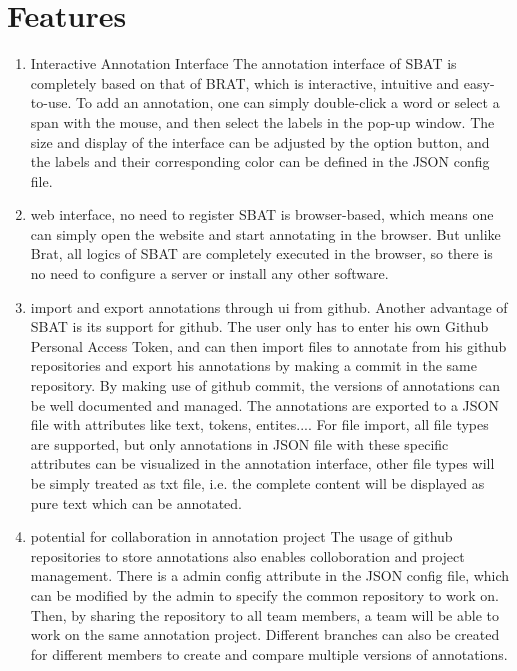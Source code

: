 \documentclass[a4paper]{article}
\begin{document}
\section{Features}
\begin{enumerate}
\item Interactive Annotation Interface
The annotation interface of SBAT is completely based on that of BRAT, which is interactive, intuitive and easy-to-use. To add an annotation, one can simply double-click a word or select a span with the mouse, and then select the labels in the pop-up window. The size and display of the interface can be adjusted by the option button, and the labels and their corresponding color can be defined in the JSON config file.
\item web interface, no need to register
SBAT is browser-based, which means one can simply open the website and start annotating in the browser. But unlike Brat, all logics of SBAT are completely executed in the browser, so there is no need to configure a server or install any other software.
\item import and export annotations through ui from github.
Another advantage of SBAT is its support for github. The user only has to enter his own Github Personal Access Token, and can then import files to annotate from his github repositories and export his annotations by making a commit in the same repository. By making use of github commit, the versions of annotations can be well documented and managed. The annotations are exported to a JSON file with attributes like text, tokens, entites.... For file import, all file types are supported, but only annotations in JSON file with these specific attributes can be visualized in the annotation interface, other file types will be simply treated as txt file, i.e. the complete content will be displayed as pure text which can be annotated.
\item potential for collaboration in annotation project
The usage of github repositories to store annotations also enables colloboration and project management. There is a admin config attribute in the JSON config file, which can be modified by the admin to specify the common repository to work on. Then, by sharing the repository to all team members, a team will be able to work on the same annotation project. Different branches can also be created for different members to create and compare multiple versions of annotations.
\end{enumerate}
\end{document}
